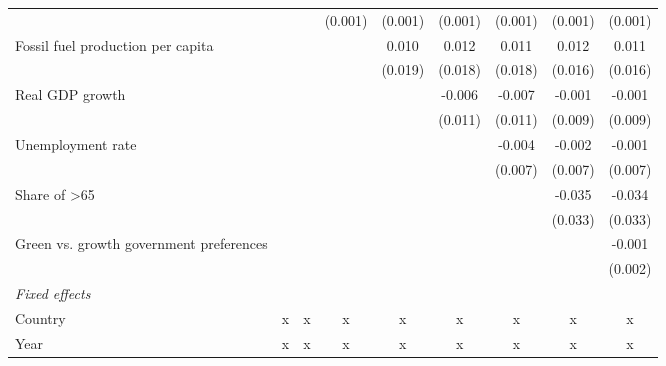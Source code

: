 \begin{table}[htbp]
\begin{tabular}{lcccccccc}
                                              &                &                & (0.001)      & (0.001)      & (0.001)      & (0.001)      & (0.001)       & (0.001)\\   
      Fossil fuel production per capita       &                &                &              & 0.010        & 0.012        & 0.011        & 0.012         & 0.011\\   
                                              &                &                &              & (0.019)      & (0.018)      & (0.018)      & (0.016)       & (0.016)\\   
      Real GDP growth                         &                &                &              &              & -0.006       & -0.007       & -0.001        & -0.001\\   
                                              &                &                &              &              & (0.011)      & (0.011)      & (0.009)       & (0.009)\\   
      Unemployment rate                       &                &                &              &              &              & -0.004       & -0.002        & -0.001\\   
                                              &                &                &              &              &              & (0.007)      & (0.007)       & (0.007)\\   
      Share of >65                            &                &                &              &              &              &              & -0.035        & -0.034\\   
                                              &                &                &              &              &              &              & (0.033)       & (0.033)\\   
      Green vs. growth government preferences &                &                &              &              &              &              &               & -0.001\\   
                                              &                &                &              &              &              &              &               & (0.002)\\   
      \emph{Fixed effects}\\
      Country                                 & x              & x              & x            & x            & x            & x            & x             & x\\  
      Year                                    & x              & x              & x            & x            & x            & x            & x             & x\\  

\end{tabular}
\end{table}

